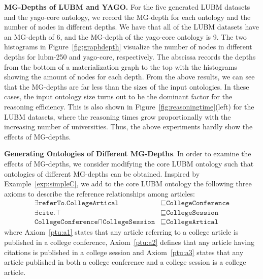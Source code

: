 \textbf{MG-Depths of LUBM and YAGO.}
For the five generated LUBM datasets and the yago-core ontology, we record the MG-depth
for each ontology and the number of nodes in different depths.
We have that all of the LUBM datasets have an MG-depth of 6,
and the MG-depth of the yago-core ontology is 9.
The two histograms in Figure~\ref{fig:graphdepth} visualize the number
of nodes in different depths for lubm-250 and yago-core,
respectively. 
The abscissa records the depths from the bottom of a materialization
graph to the top with
the histograms showing the amount of nodes for each depth.
%
From the above results, we can see that the MG-depths are far less than
the sizes of the input ontologies. In these cases, the input ontology size
turns out to be the dominant factor for the reasoning efficiency.
This is also shown in Figure~\ref{fig:reasoningtime}(left) for the LUBM datasets,
where the reasoning times grow proportionally with the increasing number
of universities.
%
Thus, the above experiments hardly show the effects of MG-depths.

\textbf{Generating Ontologies of Different MG-Depths}.
In order to examine the effects of MG-depths, we consider modifying the core LUBM ontology
such that ontologies of different MG-depths can be obtained.
Inspired by Example~\ref{exp:simpleC},
we add to the core LUBM ontology the following three axioms to
describe the reference relationships among articles:
\begin{align}
\exists\texttt{referTo}.\texttt{CollegeArtical} & \sqsubseteq\texttt{CollegeConference}\label{ptu:a1}\tag{$\beta_1$}\\
\exists\texttt{cite}.\top & \sqsubseteq\texttt{CollegeSession}\label{ptu:a2}\tag{$\beta_2$}\\
\texttt{CollegeConference}\sqcap\texttt{CollegeSession} & \sqsubseteq\texttt{CollegeArtical}\label{ptu:a3}\tag{$\beta_3$}
\end{align}
where Axiom~\eqref{ptu:a1} states that any article referring to a
college article is published in a college conference,
Axiom~\eqref{ptu:a2} defines that any article having citations is
published in a college session and Axiom~\eqref{ptu:a3} states that
any article published in both a college conference and a college
session is a college article.

